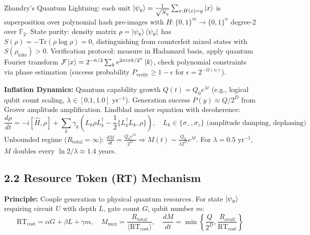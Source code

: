 \documentclass[a4paper,11pt,twoside]{article}
\begin{document}
Zhandry's Quantum Lightning: each unit $\ket{\psi_y} = \frac{1}{\sqrt{N_y}}\sum_{x: H(x)=y} \ket{x}$ is superposition over polynomial hash pre-images with $H: \{0,1\}^m \to \{0,1\}^n$ degree-2 over $\mathbb{F}_2$. State purity: density matrix $\rho = \ket{\psi_y}\bra{\psi_y}$ has $S(\rho) = -\text{Tr}(\rho\log\rho) = 0$, distinguishing from counterfeit mixed states with $S(\rho_{\text{fake}}) > 0$. Verification protocol: measure in Hadamard basis, apply quantum Fourier transform $\mathcal{F}\ket{x} = 2^{-n/2}\sum_k e^{2\pi ixk/2^n}\ket{k}$, check polynomial constraints via phase estimation (success probability $P_{\text{verify}} \geq 1-\epsilon$ for $\epsilon = 2^{-\Omega(n)}$).

\textbf{Inflation Dynamics:} Quantum capability growth $Q(t) = Q_0 e^{\lambda t}$ (e.g., logical qubit count scaling, $\lambda \in [0.1, 1.0]$ yr$^{-1}$). Generation success $P(y) \approx Q/2^D$ from Grover amplitude amplification. Lindblad master equation with decoherence:
\vspace{-4pt}
\[
\frac{d\rho}{dt} = -i[\hat{H}, \rho] + \sum_k \gamma_k \left(L_k \rho L_k^\dagger - \frac{1}{2}\{L_k^\dagger L_k, \rho\}\right), \quad L_k \in \{\sigma_-, \sigma_z\} \text{ (amplitude damping, dephasing)}
\]
\vspace{-6pt}
Unbounded regime ($R_{\text{total}} = \infty$): $\frac{dM}{dt} = \frac{Q_0 e^{\lambda t}}{2^D} \Rightarrow M(t) \sim \frac{Q_0}{\lambda 2^D}e^{\lambda t}$. For $\lambda = 0.5$ yr$^{-1}$, $M$ doubles every $\ln 2/\lambda \approx 1.4$ years.

\vspace{-4pt}
\subsection*{2.2 Resource Token (RT) Mechanism}
\vspace{-4pt}

\textbf{Principle:} Couple generation to physical quantum resources. For state $\ket{\psi_y}$ requiring circuit $U$ with depth $L$, gate count $G$, qubit number $m$:
\vspace{-4pt}
\[
\text{RT}_{\text{cost}} = \alpha G + \beta L + \gamma m, \quad M_{\max} = \frac{R_{\text{total}}}{\langle \text{RT}_{\text{cost}} \rangle}, \quad \frac{dM}{dt} = \min\left\{\frac{Q}{2^D}, \frac{R_{\text{avail}}}{\text{RT}_{\text{cost}}}\right\}
\]
\vspace{-6pt}
\end{document}
